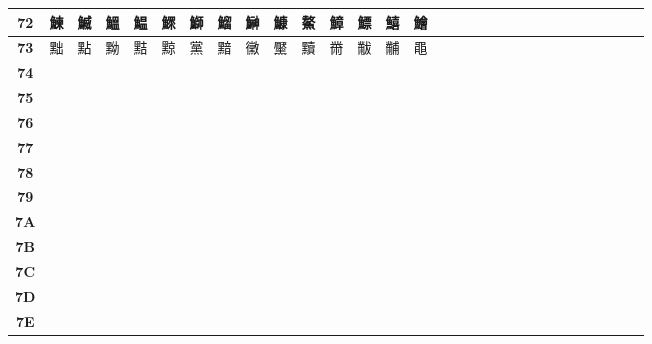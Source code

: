 \begin{table}[H]
\begin{tabular}{|Sc|Sc|Sc|Sc|Sc|Sc|Sc|Sc|Sc|Sc|Sc|Sc|Sc|Sc|Sc|}
\textbf{72} & 鰊 & 鰄 & 鰮 & 鰛 & 鰥 & 鰤 & 鰡 & 鰰 & 鱇 & 鰲 & 鱆 & 鰾 & 鱚 & 鱠 \\ \hline
\textbf{73} & 黜 & 點 & 黝 & 黠 & 黥 & 黨 & 黯 & 黴 & 黶 & 黷 & 黹 & 黻 & 黼 & 黽 \\ \hline
\textbf{74} &  &  &  &  &  &  &  &  &  &  &  &  &  &  \\ \hline
\textbf{75} &  &  &  &  &  &  &  &  &  &  &  &  &  &  \\ \hline
\textbf{76} &  &  &  &  &  &  &  &  &  &  &  &  &  &  \\ \hline
\textbf{77} &  &  &  &  &  &  &  &  &  &  &  &  &  &  \\ \hline
\textbf{78} &  &  &  &  &  &  &  &  &  &  &  &  &  &  \\ \hline
\textbf{79} &  &  &  &  &  &  &  &  &  &  &  &  &  &  \\ \hline
\textbf{7A} &  &  &  &  &  &  &  &  &  &  &  &  &  &  \\ \hline
\textbf{7B} &  &  &  &  &  &  &  &  &  &  &  &  &  &  \\ \hline
\textbf{7C} &  &  &  &  &  &  &  &  &  &  &  &  &  &  \\ \hline
\textbf{7D} &  &  &  &  &  &  &  &  &  &  &  &  &  &  \\ \hline
\textbf{7E} &  &  &  &  &  &  &  &  &  &  &  &  &  &  \\ \hline
\end{tabular}
\end{table}

